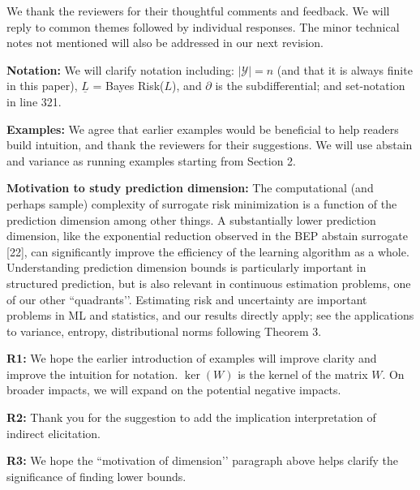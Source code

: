 \documentclass{article}
\newcommand{\Y}{\mathcal{Y}}
\begin{document}
We thank the reviewers for their thoughtful comments and feedback.  We will reply to common themes followed by individual responses.  The minor technical notes not mentioned will also be addressed in our next revision.  

\textbf{Notation:} We will clarify notation including: $|\Y| = n$ (and that it is always finite in this paper), $\underline{L}$ = Bayes Risk($L$), and $\partial$ is the subdifferential; and set-notation in line 321.

\textbf{Examples:} We agree that earlier examples would be beneficial to help readers build intuition, and thank the reviewers for their suggestions. We will use abstain and variance as running examples starting from Section 2.

\textbf{Motivation to study prediction dimension:}  The computational (and perhaps sample) complexity of surrogate risk minimization is a function of the prediction dimension among other things.  A substantially lower prediction dimension, like the exponential reduction observed in the BEP abstain surrogate [22], can significantly improve the efficiency of the learning algorithm as a whole.  Understanding prediction dimension bounds is particularly important in structured prediction, but is also relevant in continuous estimation problems, one of our other ``quadrants’’.  Estimating risk and uncertainty are important problems in ML and statistics, and our results directly apply; see the applications to variance, entropy, distributional norms following Theorem 3.


\textbf{R1:}  We hope the earlier introduction of examples will improve clarity and improve the intuition for notation. $\ker(W)$ is the kernel of the matrix $W$. On broader impacts, we will expand on the potential negative impacts.

\textbf{R2:}  Thank you for the suggestion to add the implication interpretation of indirect elicitation.

\textbf{R3:} We hope the ``motivation of dimension’’ paragraph above helps clarify the significance of finding lower bounds.
\end{document}
